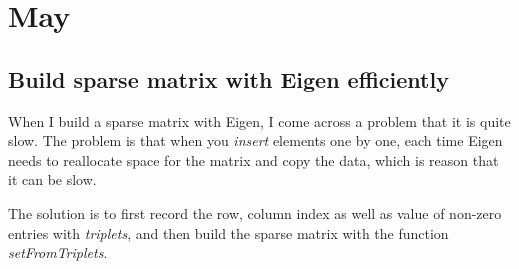 \chapter{May}

\section{Build sparse matrix with Eigen efficiently} 

When I build a sparse matrix with Eigen, I come across a problem that it is quite slow. The problem is that
when you \textit{insert} elements one by one, each time Eigen needs to reallocate space for the matrix and copy
the data, which is reason that it can be slow. 

The solution is to first record the row, column index as well as value of non-zero entries with \textit{triplets},
and then build the sparse matrix with the function \textit{setFromTriplets}.

